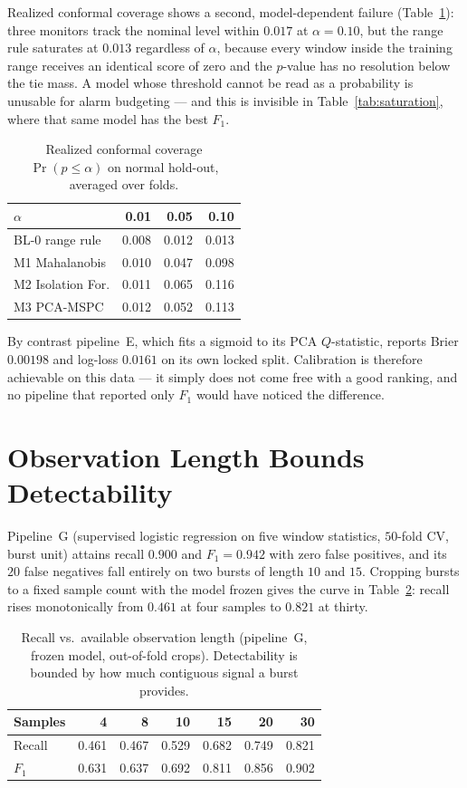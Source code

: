 \documentclass{article}
\begin{document}
Realized conformal coverage shows a second, model-dependent failure
(Table~\ref{tab:coverage}): three monitors track the nominal level within
$0.017$ at $\alpha = 0.10$, but the range rule saturates at $0.013$ regardless
of $\alpha$, because every window inside the training range receives an
identical score of zero and the $p$-value has no resolution below the tie mass.
A model whose threshold cannot be read as a probability is unusable for alarm
budgeting --- and this is invisible in Table~\ref{tab:saturation}, where that
same model has the best $F_1$.

\begin{table}[t]
\caption{Realized conformal coverage $\Pr(p \le \alpha)$ on normal hold-out,
averaged over folds.}
\label{tab:coverage}
\vskip 0.08in
\centering
\small
\begin{tabular}{lrrr}
\toprule
$\alpha$ & 0.01 & 0.05 & 0.10 \\
\midrule
BL-0 range rule   & 0.008 & 0.012 & 0.013 \\
M1 Mahalanobis    & 0.010 & 0.047 & 0.098 \\
M2 Isolation For. & 0.011 & 0.065 & 0.116 \\
M3 PCA-MSPC       & 0.012 & 0.052 & 0.113 \\
\bottomrule
\end{tabular}
\end{table}

By contrast pipeline~E, which fits a sigmoid to its PCA $Q$-statistic, reports
Brier $0.00198$ and log-loss $0.0161$ on its own locked split. Calibration is
therefore achievable on this data --- it simply does not come free with a good
ranking, and no pipeline that reported only $F_1$ would have noticed the
difference.

\section{Observation Length Bounds Detectability}
\label{sec:length}

Pipeline~G (supervised logistic regression on five window statistics,
$50$-fold CV, burst unit) attains recall $0.900$ and $F_1 = 0.942$ with zero
false positives, and its $20$ false negatives fall entirely on two bursts of
length $10$ and $15$. Cropping bursts to a fixed sample count with the model
frozen gives the curve in Table~\ref{tab:length}: recall rises monotonically
from $0.461$ at four samples to $0.821$ at thirty.

\begin{table}[t]
\caption{Recall vs.\ available observation length (pipeline~G, frozen model,
out-of-fold crops). Detectability is bounded by how much contiguous signal a
burst provides.}
\label{tab:length}
\vskip 0.08in
\centering
\small
\begin{tabular}{lrrrrrr}
\toprule
Samples   & 4 & 8 & 10 & 15 & 20 & 30 \\
\midrule
Recall    & 0.461 & 0.467 & 0.529 & 0.682 & 0.749 & 0.821 \\
$F_1$     & 0.631 & 0.637 & 0.692 & 0.811 & 0.856 & 0.902 \\
\bottomrule
\end{tabular}
\end{table}
\end{document}
